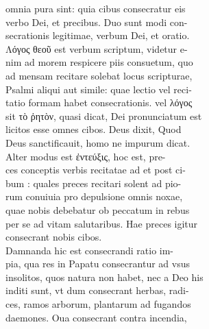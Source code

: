 \documentclass{article}
\begin{document}
\begin{pages}
                omnia pura sint: quia cibus consecratur eis \\
                verbo Dei, et precibus. Duo sunt modi con- \\
                secrationis legitimae, verbum Dei, et oratio. \\
                Λόγος θεοῦ est verbum scriptum, videtur e- \\
                nim ad morem respicere piis consuetum, quo \\
                ad mensam recitare solebat locus scripturae, \\
                Psalmi aliqui aut simile: quae lectio vel reci- \\
                tatio formam habet consecrationis. vel λόγος \\
                sit τὸ ῤητὸν, quasi dicat, Dei pronunciatum est \\
                licitos esse omnes cibos. Deus dixit, Quod \\
                Deus sanctificauit, homo ne impurum dicat. \\
                Alter modus est ἐντεύξις, hoc est, pre- \\
                ces conceptis verbis recitatae ad et post ci- \\
                bum : quales preces recitari solent ad pio- \\
                rum conuiuia pro depulsione omnis noxae, \\
                quae nobis debebatur ob peccatum in rebus \\
                per se ad vitam salutaribus. Hae preces igitur \\
                consecrant nobis cibos. \\
                Damnanda hic est consecrandi ratio im- \\
                pia, qua res in Papatu consecrantur ad vsus \\
                insolitos, quos natura non habet, nec a Deo his \\
                inditi sunt, vt dum consecrant herbas, radi- \\
                ces, ramos arborum, plantarum ad fugandos \\
                daemones. Oua consecrant contra incendia, \\

\end{pages}
\end{document}
